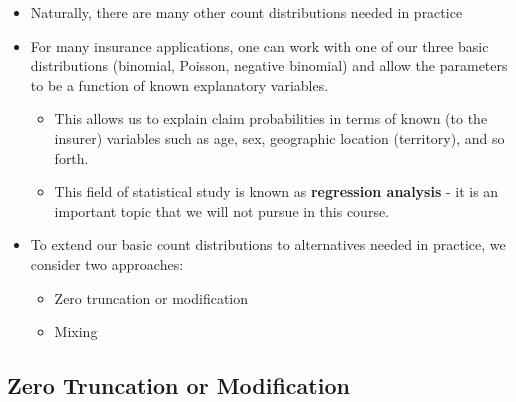 \documentclass[]{book}
\begin{document}
\begin{itemize}
\item
  Naturally, there are many other count distributions needed in practice
\item
  For many insurance applications, one can work with one of our three
  basic distributions (binomial, Poisson, negative binomial) and allow
  the parameters to be a function of known explanatory variables.

  \begin{itemize}
  \item
    This allows us to explain claim probabilities in terms of known (to
    the insurer) variables such as age, sex, geographic location
    (territory), and so forth.
  \item
    This field of statistical study is known as \textbf{regression
    analysis} - it is an important topic that we will not pursue in this
    course.
  \end{itemize}
\item
  To extend our basic count distributions to alternatives needed in
  practice, we consider two approaches:

  \begin{itemize}
  \item
    Zero truncation or modification
  \item
    Mixing
  \end{itemize}
\end{itemize}

\subsection{Zero Truncation or
Modification}\label{zero-truncation-or-modification}
\end{document}
